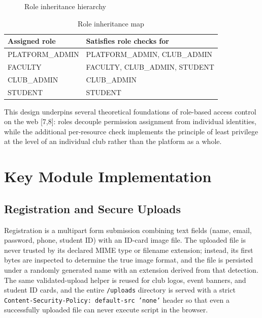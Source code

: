 \documentclass[12pt,oneside]{book}
\begin{document}
\begin{figure}[H]
\centering
{}
\caption{Role inheritance hierarchy}
\label{fig:4.4}
\end{figure}

\begin{table}[H]
\caption{Role inheritance map}
\label{tab:4.5}
\centering
\small
\begin{tabularx}{\textwidth}{@{}>{\RaggedRight\arraybackslash}p{4cm}X@{}}
\toprule
Assigned role & Satisfies role checks for \\
\midrule
PLATFORM\_ADMIN & PLATFORM\_ADMIN, CLUB\_ADMIN \\
FACULTY & FACULTY, CLUB\_ADMIN, STUDENT \\
CLUB\_ADMIN & CLUB\_ADMIN \\
STUDENT & STUDENT \\
\bottomrule
\end{tabularx}
\end{table}

This design underpins several theoretical foundations of role-based access control on the web [7,8]: roles decouple permission assignment from individual identities, while the additional per-resource check implements the principle of least privilege at the level of an individual club rather than the platform as a whole.

\section{Key Module Implementation}

\subsection{Registration and Secure Uploads}
Registration is a multipart form submission combining text fields (name, email, password, phone, student ID) with an ID-card image file. The uploaded file is never trusted by its declared MIME type or filename extension; instead, its first bytes are inspected to determine the true image format, and the file is persisted under a randomly generated name with an extension derived from that detection. The same validated-upload helper is reused for club logos, event banners, and student ID cards, and the entire \texttt{/uploads} directory is served with a strict \texttt{Content-Security-Policy: default-src 'none'} header so that even a successfully uploaded file can never execute script in the browser.
\end{document}
